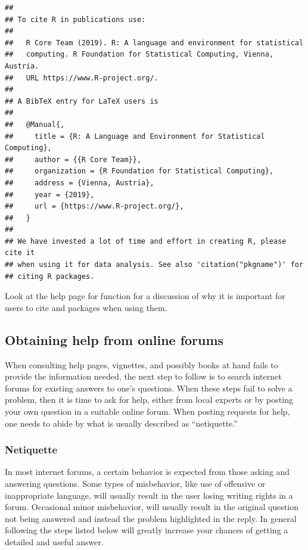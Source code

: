 \documentclass[krantz2]{krantz}\usepackage{knitr}
\begin{document}
\begin{knitrout}\footnotesize
{}\color{fgcolor}\begin{kframe}
\begin{alltt}
\hlstd{()}
\end{alltt}
\begin{verbatim}
## 
## To cite R in publications use:
## 
##   R Core Team (2019). R: A language and environment for statistical
##   computing. R Foundation for Statistical Computing, Vienna, Austria.
##   URL https://www.R-project.org/.
## 
## A BibTeX entry for LaTeX users is
## 
##   @Manual{,
##     title = {R: A Language and Environment for Statistical Computing},
##     author = {{R Core Team}},
##     organization = {R Foundation for Statistical Computing},
##     address = {Vienna, Austria},
##     year = {2019},
##     url = {https://www.R-project.org/},
##   }
## 
## We have invested a lot of time and effort in creating R, please cite it
## when using it for data analysis. See also 'citation("pkgname")' for
## citing R packages.
\end{verbatim}
\end{kframe}
\end{knitrout}

\begin{playground}
  Look at the help page for function  for a discussion of why it is important for users to cite \Rpgrm and packages when using them.
\end{playground}

\subsection{Obtaining help from online forums}\label{sec:intro:net:help}

When consulting help pages, vignettes, and possibly books at hand fails to provide the information needed, the next step to follow is to search internet forums for existing answers to one's questions. When these steps fail to solve a problem, then it is time to ask for help, either from local experts or by posting your own question in a suitable online forum. When posting requests for help, one needs to abide by what is usually described as ``netiquette.''

\subsubsection{Netiquette}
In most internet forums, a certain behavior is expected from those asking and answering questions. Some types of misbehavior, like use of offensive or inappropriate language, will usually result in the user losing writing rights in a forum. Occasional minor misbehavior, will usually result in the original question not being answered and instead the problem highlighted in the reply. In general following the steps listed below will greatly increase your chances of getting a detailed and useful answer.
\end{document}
